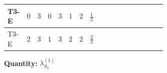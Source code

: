 \documentclass[8pt]{article}
\begin{document}
\begin{landscape}
\begin{longtable}{@{}llcccccc >{\raggedright\arraybackslash}p{0.21\linewidth} >{\raggedright\arraybackslash}p{0.21\linewidth} >{\raggedright\arraybackslash}p{0.21\linewidth}@{}}
\midrule
T3-E & $0$ & $3$ & $0$ & $3$ & $1$ & $2$ & $\frac{1}{2}$ & \scriptsize\adjustbox{max width=\linewidth}{$\begin{gathered} +12 {g_1}^4\end{gathered}$} & \scriptsize\adjustbox{max width=\linewidth}{$\begin{gathered} +6 {\lambda_{12}^{(1)}}^2\end{gathered}$} & \scriptsize\adjustbox{max width=\linewidth}{$\begin{gathered} +4 {\lambda_{HS_2}^{(1)}}^2\end{gathered}$} \\
\midrule
T3-E & $2$ & $3$ & $1$ & $3$ & $2$ & $2$ & $\frac{3}{2}$ & \scriptsize\adjustbox{max width=\linewidth}{$\begin{gathered} +192 {g_1}^4\end{gathered}$} & \scriptsize\adjustbox{max width=\linewidth}{$\begin{gathered} +6 {\lambda_{12}^{(1)}}^2\end{gathered}$} & \scriptsize\adjustbox{max width=\linewidth}{$\begin{gathered} +4 {\lambda_{HS_2}^{(1)}}^2\end{gathered}$} \\
\midrule
\bottomrule
\end{longtable}
\clearpage
\noindent\textbf{Quantity: }$\lambda_{S_2}^{(1)}$\par\smallskip

\end{landscape}
\end{document}
